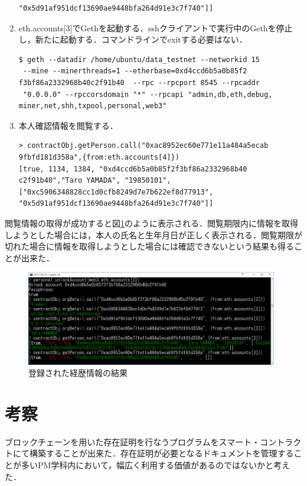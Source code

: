 \begin{enumerate}
\begin{verbatim}
"0x5d91af951dcf13690ae9448bfa264d91e3c7f740"]]
\end{verbatim}
\item eth.accounts[3]でGethを起動する．sshクライアントで実行中のGethを停止し，新たに起動する．コマンドラインでexitする必要はない．
\begin{verbatim}
$ geth --datadir /home/ubuntu/data_testnet --networkid 15
 --mine --minerthreads=1 --etherbase=0xd4ccd6b5a0b85f2
f3bf86a2332968b40c2f91b40  --rpc --rpcport 8545 --rpcaddr
 "0.0.0.0" --rpccorsdomain "*" --rpcapi "admin,db,eth,debug,
miner,net,shh,txpool,personal,web3"
\end{verbatim}
\item 本人確認情報を閲覧する．
\begin{verbatim}
> contractObj.getPerson.call("0xac8952ec60e771e11a484a5ecab
9fbfd181d358a",{from:eth.accounts[4]})
[true, 1134, 1384, "0xd4ccd6b5a0b85f2f3bf86a2332968b40
c2f91b40","Taro YAMADA", "19850101",
["0xc5906348828cc1d0cfb8249d7e7b622ef8d77913",
"0x5d91af951dcf13690ae9448bfa264d91e3c7f740"]]
\end{verbatim}

\end{enumerate}

閲覧情報の取得が成功すると図\ref{code}のように表示される．閲覧期限内に情報を取得しようとした場合には，本人の氏名と生年月日が正しく表示される．閲覧期限が切れた場合に情報を取得しようとした場合には確認できないという結果も得ることが出来た．

\begin{figure}[htb]
\centering
\includegraphics[width=11cm]{images/code.png}
\caption{登録された経歴情報の結果}\label{code}
\end{figure}

\chapter{考察}

ブロックチェーンを用いた存在証明を行なうプログラムをスマート・コントラクトにて構築することが出来た．存在証明が必要となるドキュメントを管理することが多いPM学科内において，幅広く利用する価値があるのではないかと考えた．

